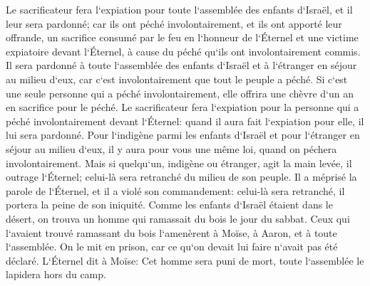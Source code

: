 \verse Le sacrificateur fera l`expiation pour toute l`assemblée des enfants d`Israël, et il leur sera pardonné; car ils ont péché involontairement, et ils ont apporté leur offrande, un sacrifice consumé par le feu en l`honneur de l`Éternel et une victime expiatoire devant l`Éternel, à cause du péché qu`ils ont involontairement commis. 
\verse Il sera pardonné à toute l`assemblée des enfants d`Israël et à l`étranger en séjour au milieu d`eux, car c`est involontairement que tout le peuple a péché. 
\verse Si c`est une seule personne qui a péché involontairement, elle offrira une chèvre d`un an en sacrifice pour le péché. 
\verse Le sacrificateur fera l`expiation pour la personne qui a péché involontairement devant l`Éternel: quand il aura fait l`expiation pour elle, il lui sera pardonné. 
\verse Pour l`indigène parmi les enfants d`Israël et pour l`étranger en séjour au milieu d`eux, il y aura pour vous une même loi, quand on péchera involontairement. 
\verse Mais si quelqu`un, indigène ou étranger, agit la main levée, il outrage l`Éternel; celui-là sera retranché du milieu de son peuple. 
\verse Il a méprisé la parole de l`Éternel, et il a violé son commandement: celui-là sera retranché, il portera la peine de son iniquité. 
\verse Comme les enfants d`Israël étaient dans le désert, on trouva un homme qui ramassait du bois le jour du sabbat. 
\verse Ceux qui l`avaient trouvé ramassant du bois l`amenèrent à Moïse, à Aaron, et à toute l`assemblée. 
\verse On le mit en prison, car ce qu`on devait lui faire n`avait pas été déclaré. 
\verse L`Éternel dit à Moïse: Cet homme sera puni de mort, toute l`assemblée le lapidera hors du camp. 
